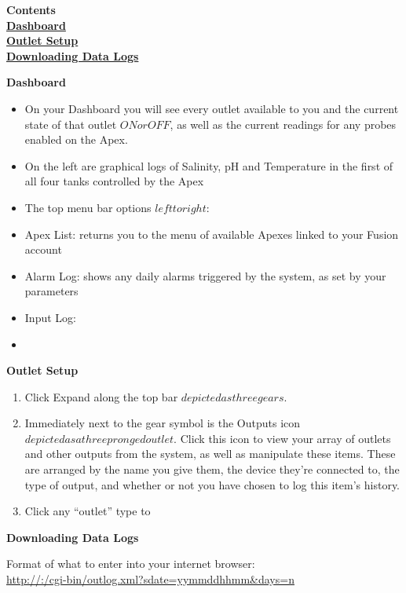\documentclass[]{book}
\providecommand{\tightlist}{%
  \setlength{\itemsep}{0pt}\setlength{\parskip}{0pt}}
\begin{document}
\textbf{Contents}\\
\href{09-apex_fusion_guide.md\#Dashboard}{\textbf{Dashboard}}\\
\href{09-apex_fusion_guide.md\#Outlet_Setup}{\textbf{Outlet Setup}}\\
\href{09-apex_fusion_guide.md\#Data_Logs}{\textbf{Downloading Data
Logs}}

\textbf{Dashboard}

\begin{itemize}
\item
  On your Dashboard you will see every outlet available to you and the
  current state of that outlet \(ON or OFF\), as well as the current
  readings for any probes enabled on the Apex.
\item
  On the left are graphical logs of Salinity, pH and Temperature in the
  first of all four tanks controlled by the Apex
\item
  The top menu bar options \(left to right\):
\item
  Apex List: returns you to the menu of available Apexes linked to your
  Fusion account
\item
  Alarm Log: shows any daily alarms triggered by the system, as set by
  your parameters
\item
  Input Log:
\item
\end{itemize}

\textbf{Outlet Setup}

\begin{enumerate}
\def\labelenumi{\arabic{enumi}.}
\tightlist
\item
  Click Expand along the top bar \(depicted as three gears\).
\item
  Immediately next to the gear symbol is the Outputs icon
  \(depicted as a three pronged outlet\). Click this icon to view your
  array of outlets and other outputs from the system, as well as
  manipulate these items. These are arranged by the name you give them,
  the device they're connected to, the type of output, and whether or
  not you have chosen to log this item's history.
\item
  Click any ``outlet'' type to
\end{enumerate}

\textbf{Downloading Data Logs}

Format of what to enter into your internet browser:\\
\url{http://:/cgi-bin/outlog.xml?sdate=yymmddhhmm\&days=n}
\end{document}
